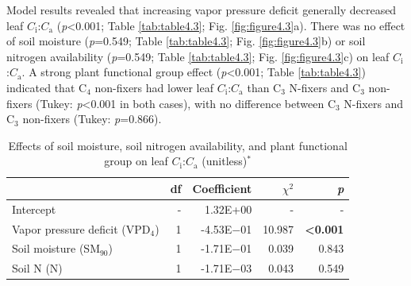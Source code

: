 Model results revealed that increasing vapor pressure deficit generally decreased leaf $C_\mathrm{i}$:$C_\mathrm{a}$ (\textit{p}<0.001; Table \ref{tab:table4.3}; Fig. \ref{fig:figure4.3}a). There was no effect of soil moisture (\textit{p}=0.549; Table \ref{tab:table4.3}; Fig. \ref{fig:figure4.3}b) or soil nitrogen availability (\textit{p}=0.549; Table \ref{tab:table4.3}; Fig. \ref{fig:figure4.3}c) on leaf $C_\mathrm{i}$:$C_\mathrm{a}$. A strong plant functional group effect (\textit{p}<0.001; Table \ref{tab:table4.3}) indicated that C$_4$ non-fixers had lower leaf $C_\mathrm{i}$:$C_\mathrm{a}$ than C$_3$ N-fixers and C$_3$ non-fixers (Tukey: \textit{p}<0.001 in both cases), with no difference between C$_3$ N-fixers and C$_3$ non-fixers (Tukey: \textit{p}=0.866).

\newpage
\begin{table}
    \centering
    \caption[Effects of soil moisture, soil nitrogen availability, and plant functional group on leaf $C_\mathrm{i}$:$C_\mathrm{a}$]{Effects of soil moisture, soil nitrogen availability, and plant functional group on leaf $C_\mathrm{i}$:$C_\mathrm{a}$ (unitless)$^*$}
        \begin{tabular}{p{6cm}p{0.5cm}p{2cm}p{1.5cm}p{1.5cm}}
            \hline 
            & \multicolumn{1}{r}{df} 
            & \multicolumn{1}{r}{Coefficient} 
            & \multicolumn{1}{r}{$\chi^{2}$} 
            & \multicolumn{1}{r}{\textit{p}} 
            \\ 
            \hline
            
            Intercept
            & \multicolumn{1}{r}{-}
            & \multicolumn{1}{r}{1.32E+00}
            & \multicolumn{1}{r}{-}
            & \multicolumn{1}{r}{-}
            \\

            Vapor pressure deficit (VPD$_4$)
            & \multicolumn{1}{r}{1}
            & \multicolumn{1}{r}{-4.53E$-$01}
            & \multicolumn{1}{r}{10.987}
            & \multicolumn{1}{r}{\textbf{<0.001}}
            \\

            Soil moisture (SM$_{90}$)
            & \multicolumn{1}{r}{1}
            & \multicolumn{1}{r}{-1.71E$-$01}
            & \multicolumn{1}{r}{0.039}
            & \multicolumn{1}{r}{0.843}
            \\

            Soil N (N)
            & \multicolumn{1}{r}{1}
            & \multicolumn{1}{r}{-1.71E$-$03}
            & \multicolumn{1}{r}{0.043}
            & \multicolumn{1}{r}{0.549}
            \\


\end{tabular}
\end{table}
